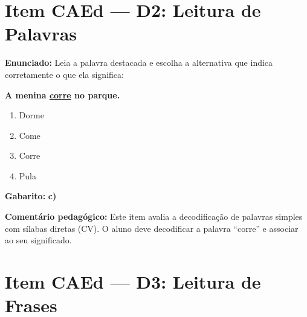 \section{Item CAEd --- D2: Leitura de Palavras}

\begin{exercicio}

\textbf{Enunciado:} Leia a palavra destacada e escolha a alternativa
que indica corretamente o que ela significa:

\begin{center}
\textbf{A menina \underline{corre} no parque.}
\end{center}

\begin{enumerate}[label=\alph*)]
  \item Dorme
  \item Come
  \item Corre
  \item Pula
\end{enumerate}

\textbf{Gabarito:} \textbf{c)}

\textbf{Coment\'{a}rio pedag\'{o}gico:} Este item avalia a
decodifica\c{c}\~{a}o de palavras simples com s\'{i}labas diretas
(CV). O aluno deve decodificar a palavra ``corre'' e associar ao
seu significado.
\end{exercicio}

\section{Item CAEd --- D3: Leitura de Frases}

